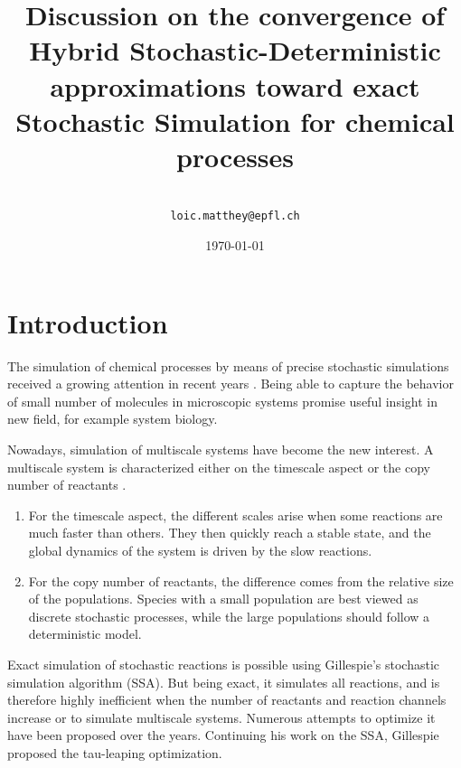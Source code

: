 \documentclass[letterpaper, oneside]{article}
\title{Discussion on the convergence of Hybrid Stochastic-Deterministic approximations toward exact Stochastic Simulation for chemical processes}
\date{\today}
\author{\loic \\
\texttt{loic.matthey@epfl.ch}}
\begin{document}
\maketitle

% 
% 
% 
% 



\section{Introduction} %
\label{sec:introduction}
The simulation of chemical processes by means of precise stochastic simulations received a growing attention in recent years \cite{Gillespie:2007p1788}. Being able to capture the behavior of small number of molecules in microscopic systems promise useful insight in new field, for example system biology.

Nowadays, simulation of multiscale systems have become the new interest. A multiscale system is characterized either on the timescale aspect or the copy number of reactants \cite{Cao:2008p5942}.
\begin{enumerate}
	\item For the timescale aspect, the different scales arise when some reactions are much faster than others. They then quickly reach a stable state, and the global dynamics of the system is driven by the slow reactions.
	\item For the copy number of reactants, the difference comes from the relative size of the populations. Species with a small population are best viewed as discrete stochastic processes, while the large populations should follow a deterministic model. 
\end{enumerate}

Exact simulation of stochastic reactions is possible using Gillespie's stochastic simulation algorithm (SSA)\cite{Gillespie:2007p1788}. But being exact, it simulates all reactions, and is therefore highly inefficient when the number of reactants and reaction channels increase or to simulate multiscale systems. Numerous attempts to optimize it have been proposed over the years. Continuing his work on the SSA, Gillespie proposed the tau-leaping optimization.
\end{document}

